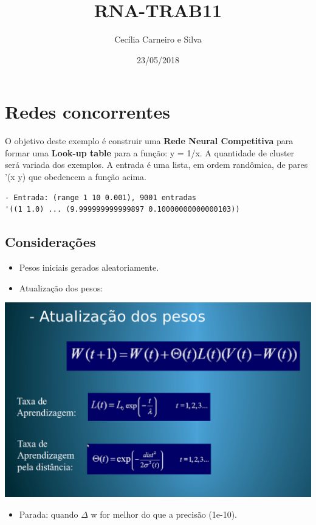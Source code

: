 \documentclass[11pt]{article}
\author{Cecília Carneiro e Silva}
\date{23/05/2018}
\title{RNA-TRAB11}
\begin{document}
\maketitle

\section{Redes concorrentes}
\label{sec-1}

O objetivo deste exemplo é construir uma \textbf{Rede Neural Competitiva} para formar uma \textbf{Look-up table} para a função: y = 1/x. A quantidade de cluster será variada dos exemplos. A entrada é uma lista, em ordem randômica, de pares '(x y) que obedencem a função acima. 

\begin{verbatim}
- Entrada: (range 1 10 0.001), 9001 entradas
'((1 1.0) ... (9.999999999999897 0.10000000000000103))
\end{verbatim}

\subsection{Considerações}
\label{sec-1-1}

\begin{itemize}
\item Pesos iniciais gerados aleatoriamente.
\item Atualização dos pesos:
\end{itemize}

\includegraphics[width=.9\linewidth]{images/w-update.png}

\begin{itemize}
\item Parada: quando $\Delta$ w for melhor do que a precisão (1e-10).
\end{itemize}
\end{document}
